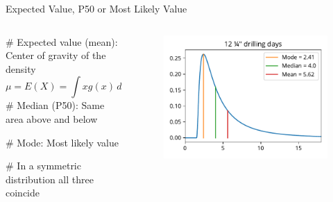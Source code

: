 \documentclass[12pt, aspectratio=149]{beamer}
\theoremstyle{plain}
\begin{document}
\begin{frame}[fragile]{Expected Value, P50 or Most Likely Value}
	\begin{columns}
		\begin{column}{0.5\textwidth}
			\begin{easylist}[itemize]
			# Expected value (mean): Center of gravity of the density
			\begin{equation*}
				\mu = E(X) = \int xg(x)\,dx
			\end{equation*}
			# Median (P50): Same area above and below
	
			# Mode: Most likely value
	
			# In a symmetric distribution all three coincide
			\end{easylist}
		\end{column}
		\begin{column}{0.5\textwidth}
			\begin{figure}
				\centering
				\includegraphics[width=0.99\linewidth]{figures/lognorm_pdf}
			\end{figure}
		\end{column}
	\end{columns}
	\end{frame}
	
\end{document}
